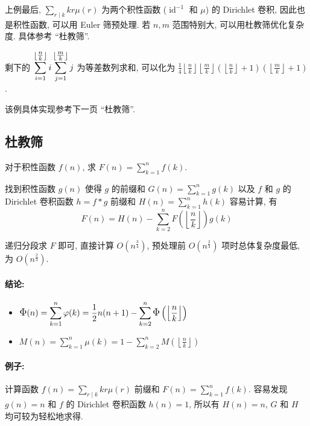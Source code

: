 上例最后, $\displaystyle\sum_{r\mid k}kr\mu(r)$ 为两个积性函数 ($\operatorname{id}^{-1}$ 和 $\mu$) 的 Dirichlet 卷积, 因此也是积性函数, 可以用 Euler 筛预处理. 若 $n,m$ 范围特别大, 可以用杜教筛优化复杂度. 具体参考 ``杜教筛''.

剩下的 $\displaystyle\sum_{i=1}^{\left\lfloor\mathlarger{\frac nk}\right\rfloor}i\sum_{j=1}^{\left\lfloor\mathlarger{\frac mk}\right\rfloor}j$ 为等差数列求和, 可以化为 $\displaystyle\frac14\left\lfloor\frac nk\right\rfloor\left\lfloor\frac mk\right\rfloor\left(\left\lfloor\frac nk\right\rfloor+1\right)\left(\left\lfloor\frac mk\right\rfloor+1\right)$.

该例具体实现参考下一页 ``杜教筛''.

\clearpage
\subsection{杜教筛}
对于积性函数 $f(n)$, 求 $\displaystyle F(n)=\sum_{k=1}^nf(k)$.

找到积性函数 $g(n)$ 使得 $g$ 的前缀和 $\displaystyle G(n)=\sum_{k=1}^ng(k)$ 以及 $f$ 和 $g$ 的 Dirichlet 卷积函数 $\displaystyle h=f*g$ 前缀和 $\displaystyle H(n)=\sum_{k=1}^nh(k)$ 容易计算, 有
\[F(n)=H(n)-\sum_{k=2}^nF\left(\left\lfloor\frac nk\right\rfloor\right)g(k)\]

递归分段求 $F$ 即可, 直接计算 $O(n^\frac34)$, 预处理前 $O(n^\frac23)$ 项时总体复杂度最低, 为 $O(n^\frac23)$.

\paragraph{结论:}
\begin{itemize}
  \item $\displaystyle\mathlarger\Phi(n)=\sum_{k=1}^n\varphi(k)=\frac12n(n+1)-\sum_{k=2}^n\mathlarger\Phi\left(\left\lfloor\frac nk\right\rfloor\right)$
  \item $\displaystyle M(n)=\sum_{k=1}^n\mu(k)=1-\sum_{k=2}^nM\left(\left\lfloor\frac nk\right\rfloor\right)$
\end{itemize}

\paragraph{例子:}

计算函数 $\displaystyle f(n)=\sum_{r\mid k}kr\mu(r)$ 前缀和 $\displaystyle F(n)=\sum_{k=1}^nf(k)$. 容易发现 $g(n)=n$ 和 $f$ 的 Dirichlet 卷积函数 $h(n)=1$, 所以有 $H(n)=n$, $G$ 和 $H$ 均可较为轻松地求得.

